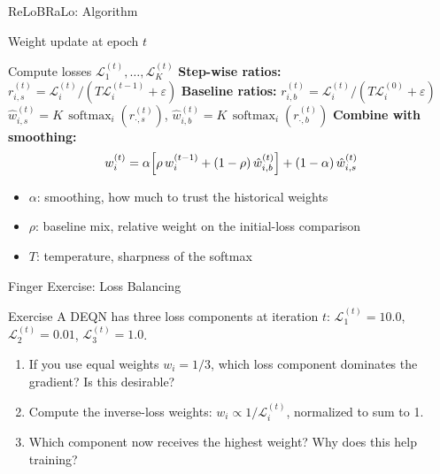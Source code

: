 \documentclass[aspectratio=169,11pt]{beamer}
\newcommand{\emphc}[1]{\textcolor{harvardcrimson}{#1}}
\begin{document}
\begin{frame}{ReLoBRaLo: Algorithm}
\begin{block}{Weight update at epoch $t$}
\begin{algorithmic}[1]
\STATE Compute losses $\mathcal{L}_1^{(t)}, \ldots, \mathcal{L}_K^{(t)}$
\STATE \textbf{Step-wise ratios:}\; $r_{i,s}^{(t)}=\mathcal{L}_i^{(t)}/(T\mathcal{L}_i^{(t-1)}+\varepsilon)$
\STATE \textbf{Baseline ratios:}\; $r_{i,b}^{(t)}=\mathcal{L}_i^{(t)}/(T\mathcal{L}_i^{(0)}+\varepsilon)$
\STATE $\hat w_{i,s}^{(t)}=K\,\operatorname{softmax}_i(r_{\cdot,s}^{(t)})$,\quad
       $\hat w_{i,b}^{(t)}=K\,\operatorname{softmax}_i(r_{\cdot,b}^{(t)})$
    \STATE \textbf{Combine with smoothing:}
\[
    w_i^{(t)} = \alpha \Bigl[\rho \, w_i^{(t-1)} + (1-\rho) \, \hat{w}_{i,b}^{(t)}\Bigr]
    + (1-\alpha) \, \hat{w}_{i,s}^{(t)}
\]
\end{algorithmic}
\end{block}

\vspace{0.3cm}
\begin{itemize}
    \item $\alpha$: smoothing, how much to trust the historical weights
    \item $\rho$: baseline mix, relative weight on the initial-loss comparison
    \item $T$: temperature, sharpness of the softmax
\end{itemize}
\end{frame}

\begin{frame}{\exercisepause{} Finger Exercise: Loss Balancing}
\begin{exampleblock}{Exercise}
A DEQN has three loss components at iteration $t$: $\mathcal{L}_1^{(t)} = 10.0$, $\mathcal{L}_2^{(t)} = 0.01$, $\mathcal{L}_3^{(t)} = 1.0$.
\begin{enumerate}
    \item If you use \emphc{equal weights} $w_i = 1/3$, which loss component dominates the gradient? Is this desirable?
    \item Compute the \emphc{inverse-loss weights}: $w_i \propto 1/\mathcal{L}_i^{(t)}$, normalized to sum to 1.
    \item Which component now receives the highest weight? Why does this help training?
\end{enumerate}
\end{exampleblock}
\end{frame}
\end{document}
